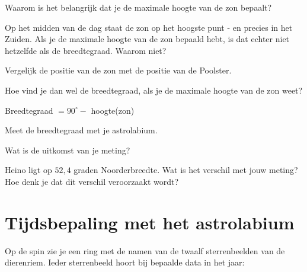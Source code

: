 \begin{opgave}
 Waarom is het belangrijk dat je de maximale hoogte van de zon bepaalt?
\end{opgave}

\begin{opgave}
 Op het midden van de dag staat de zon op het hoogste punt - en precies in het Zuiden. Als je de maximale hoogte van de zon bepaald hebt, is dat echter niet hetzelfde als de breedtegraad. Waarom niet?
 \begin{hint}
  Vergelijk de positie van de zon met de positie van de Poolster.
 \end{hint}
\end{opgave}

\begin{opgave}
 Hoe vind je dan wel de breedtegraad, als je de maximale hoogte van de zon weet?
 \begin{antwoord}
  Breedtegraad $= 90^{\circ} -$ hoogte(zon)
 \end{antwoord}
\end{opgave}

\begin{opgave}
 Meet de breedtegraad met je astrolabium.
 \begin{subopgave}
  Wat is de uitkomst van je meting?
 \end{subopgave}
 \begin{subopgave}
  Heino ligt op $52,4$ graden Noorderbreedte. Wat is het verschil met jouw meting? Hoe denk je dat dit verschil veroorzaakt wordt?
 \end{subopgave}
\end{opgave}


\section{Tijdsbepaling met het astrolabium}

Op de spin zie je een ring met de namen van de twaalf sterrenbeelden van de dierenriem. Ieder sterrenbeeld hoort bij bepaalde data in het jaar:

